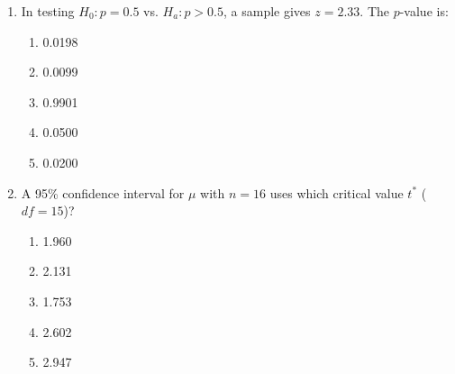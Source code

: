\begin{enumerate}[leftmargin=1.5em]
  \item In testing $H_0: p = 0.5$ vs. $H_a: p > 0.5$, a sample gives $z = 2.33$. The $p$-value is:
  \begin{enumerate}[label=(\Alph*)]
    \item 0.0198 \item 0.0099 \item 0.9901 \item 0.0500 \item 0.0200
  \end{enumerate}

  \item A 95\% confidence interval for $\mu$ with $n = 16$ uses which critical value $t^*$ ($df = 15$)?
  \begin{enumerate}[label=(\Alph*)]
    \item 1.960 \item 2.131 \item 1.753 \item 2.602 \item 2.947
  \end{enumerate}
\end{enumerate}

